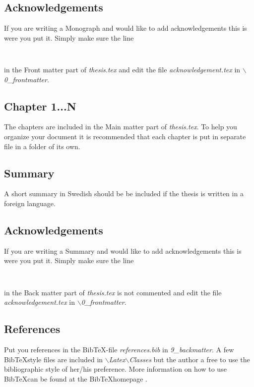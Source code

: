 \subsection{Acknowledgements}
If you are writing a Monograph and would like to add acknowledgements this is were you put it. Simply make sure the line
\begin{verbatim}
 
\end{verbatim}
in the Front matter part of \emph{thesis.tex} and edit the file  \emph{acknowledgement.tex} in \emph{$\backslash$0\_frontmatter}.

\subsection{Chapter 1...N}
The chapters are included in the Main matter part of \emph{thesis.tex}. To help you organize your document it is recommended that each chapter is put in separate file in a folder of its own.

\subsection{Summary}
A short summary in Swedish should be be included if the thesis is written in a foreign language.

\subsection{Acknowledgements}
If you are writing a Summary and would like to add acknowledgements this is were you put it. Simply make sure the line
\begin{verbatim}
 
\end{verbatim}
in the Back matter part of \emph{thesis.tex} is not commented and edit the file  \emph{acknowledgement.tex} in \emph{$\backslash$0\_frontmatter}.

\subsection{References}
Put you references in the Bib\TeX-file \emph{references.bib} in \emph{9\_backmatter}. A few Bib\TeX style files are included in \emph{$\backslash$Latex$\backslash$Classes} but the author a free to use the bibliographic style of her/his preference. More information on how to use Bib\TeX can be found at the Bib\TeX  homepage \citep{bibtex}.


